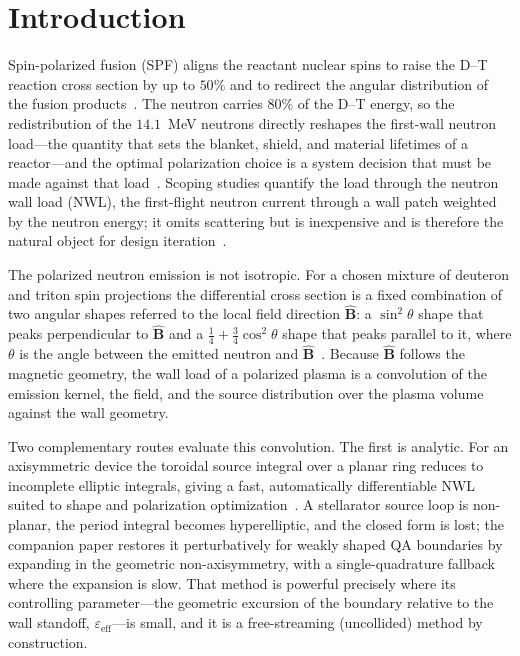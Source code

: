 \documentclass[11pt]{article}
\newcommand{\Bhat}{\hat{\bm{B}}}
\newcommand{\eps}{\varepsilon}
\newcommand{\epseff}{\eps_{\mathrm{eff}}}
\begin{document}
\section{Introduction}
\label{sec:intro}

Spin-polarized fusion (SPF) aligns the reactant nuclear spins to raise the D--T reaction
cross section by up to $50\%$ and to redirect the angular distribution of the fusion
products~\cite{kulsrud1982,parisi2024,schwartz2025}. The neutron carries $80\%$ of the
D--T energy, so the redistribution of the $14.1$~MeV neutrons directly reshapes the
first-wall neutron load---the quantity that sets the blanket, shield, and material
lifetimes of a reactor---and the optimal polarization choice is a system decision that
must be made against that load~\cite{schwartz2025,lion2022}. Scoping studies quantify the
load through the neutron wall load (NWL), the first-flight neutron current through a wall
patch weighted by the neutron energy; it omits scattering but is inexpensive and is
therefore the natural object for design iteration~\cite{lion2022,schwartz2025}.

The polarized neutron emission is not isotropic. For a chosen mixture of deuteron and
triton spin projections the differential cross section is a fixed combination of two
angular shapes referred to the local field direction $\Bhat$: a $\sin^2\theta$ shape that
peaks perpendicular to $\Bhat$ and a $\tfrac14+\tfrac34\cos^2\theta$ shape that peaks
parallel to it, where $\theta$ is the angle between the emitted neutron and
$\Bhat$~\cite{schwartz2025}. Because $\Bhat$ follows the magnetic geometry, the wall load
of a polarized plasma is a convolution of the emission kernel, the field, and the source
distribution over the plasma volume against the wall geometry.

Two complementary routes evaluate this convolution. The first is analytic. For an
axisymmetric device the toroidal source integral over a planar ring reduces to incomplete
elliptic integrals, giving a fast, automatically differentiable NWL suited to shape and
polarization optimization~\cite{schwartz2025}. A stellarator source loop is non-planar,
the period integral becomes hyperelliptic, and the closed form is lost; the companion
paper restores it perturbatively for weakly shaped QA boundaries by expanding in the
geometric non-axisymmetry, with a single-quadrature fallback where the expansion is slow.
That method is powerful precisely where its controlling parameter---the geometric
excursion of the boundary relative to the wall standoff, $\epseff$---is small, and it is a
free-streaming (uncollided) method by construction.
\end{document}

